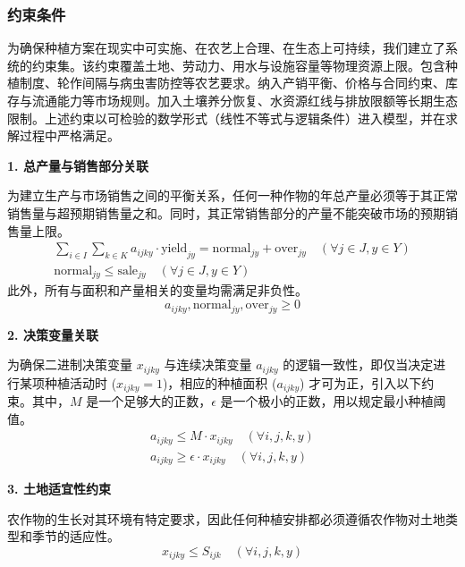 \subsubsection{约束条件}

为确保种植方案在现实中可实施、在农艺上合理、在生态上可持续，我们建立了系统的约束集。该约束覆盖土地、劳动力、用水与设施容量等物理资源上限。包含种植制度、轮作间隔与病虫害防控等农艺要求。纳入产销平衡、价格与合同约束、库存与流通能力等市场规则。加入土壤养分恢复、水资源红线与排放限额等长期生态限制。上述约束以可检验的数学形式（线性不等式与逻辑条件）进入模型，并在求解过程中严格满足。

\textbf{1. 总产量与销售部分关联}

为建立生产与市场销售之间的平衡关系，任何一种作物的年总产量必须等于其正常销售量与超预期销售量之和。同时，其正常销售部分的产量不能突破市场的预期销售量上限。
\begin{gather}
	\sum_{i \in I} \sum_{k \in K} a_{ijky} \cdot \text{yield}_{jy} = \text{normal}_{jy} + \text{over}_{jy} \quad (\forall j \in J, y \in Y) \label{eq:yield_balance} \\
	\text{normal}_{jy} \le \text{sale}_{jy} \quad (\forall j \in J, y \in Y) \label{eq:normal_sale_limit}
\end{gather}
此外，所有与面积和产量相关的变量均需满足非负性。
\begin{equation}
	a_{ijky}, \text{normal}_{jy}, \text{over}_{jy} \ge 0 \label{eq:non_negativity}
\end{equation}

\textbf{2. 决策变量关联}

为确保二进制决策变量 $x_{ijky}$ 与连续决策变量 $a_{ijky}$ 的逻辑一致性，即仅当决定进行某项种植活动时 ($x_{ijky}=1$)，相应的种植面积 ($a_{ijky}$) 才可为正，引入以下约束。其中，$M$ 是一个足够大的正数，$\epsilon$ 是一个极小的正数，用以规定最小种植阈值。
\begin{gather}
	a_{ijky} \le M \cdot x_{ijky} \quad (\forall i, j, k, y) \label{eq:big_m} \\
	a_{ijky} \ge \epsilon \cdot x_{ijky} \quad (\forall i, j, k, y) \label{eq:min_area}
\end{gather}

\textbf{3. 土地适宜性约束}

农作物的生长对其环境有特定要求，因此任何种植安排都必须遵循农作物对土地类型和季节的适应性。
\begin{equation}
	x_{ijky} \le S_{ijk} \quad (\forall i, j, k, y) \label{eq:suitability}
\end{equation}

